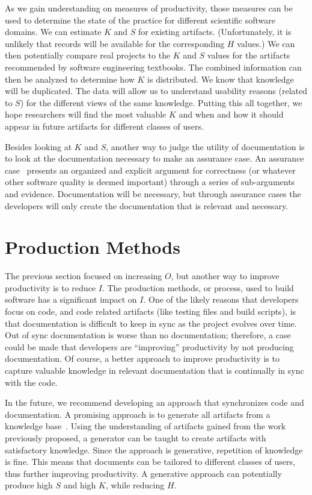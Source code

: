 \documentclass[sigconf, authorversion, nonacm]{acmart}
\begin{document}
As we gain understanding on measures of productivity, those measures can be used
to determine the state of the practice for different scientific software
domains. We can estimate $K$ and $S$ for existing artifacts. (Unfortunately, it
is unlikely that records will be available for the corresponding $H$ values.) We
can then potentially compare real projects to the $K$ and $S$ values for the
artifacts recommended by software engineering textbooks.  The combined
information can then be analyzed to determine how $K$ is distributed.  We know
that knowledge will be duplicated.  The data will allow us to understand
usability reasons (related to $S$) for the different views of the same
knowledge.  Putting this all together, we hope researchers will find the most
valuable $K$ and when and how it should appear in future artifacts for different
classes of users.

Besides looking at $K$ and $S$, another way to judge the utility of
documentation is to look at the documentation necessary to make an assurance
case. An assurance case~\cite{RinehartEtAl2015} presents an organized and
explicit argument for correctness (or whatever other software quality is deemed
important) through a series of sub-arguments and evidence.  Documentation will
be necessary, but through assurance cases the developers will only create the
documentation that is relevant and necessary. 

\section{Production Methods}

The previous section focused on increasing $O$, but another way to improve
productivity is to reduce $I$.  The production methods, or process, used to
build software has a significant impact on $I$.  One of the likely reasons that
developers focus on code, and code related artifacts (like testing files and
build scripts), is that documentation is difficult to keep in sync as the
project evolves over time.  Out of sync documentation is worse than no
documentation; therefore, a case could be made that developers are ``improving''
productivity by not producing documentation.  Of course, a better approach to
improve productivity is to capture valuable knowledge in relevant documentation
that is continually in sync with the code.

In the future, we recommend developing an approach that synchronizes code and
documentation.  A promising approach is to generate all artifacts from a
knowledge base~\cite{SzymczakEtAl2016}.  Using the understanding of artifacts
gained from the work previously proposed, a generator can be taught to create
artifacts with satisfactory knowledge. Since the approach is generative,
repetition of knowledge is fine.  This means that documents can be tailored to
different classes of users, thus further improving productivity.  A generative
approach can potentially produce high $S$ and high $K$, while reducing $H$.
\end{document}

